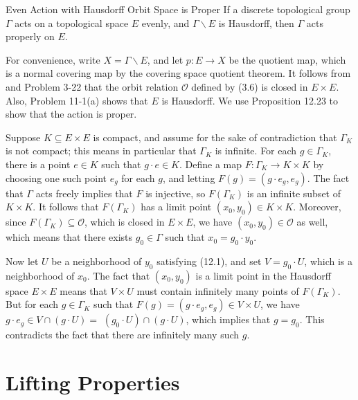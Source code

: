 \documentclass{report}
\begin{document}
\begin{proposition}{Even Action with Hausdorff Orbit Space is Proper}{}
	If a discrete topological group $\Gamma$ acts on a topological space $E$ evenly, and $\Gamma\backslash E$ is Hausdorff, then $\Gamma$ acts properly on $E$.
\end{proposition}
\begin{prf}
	For convenience, write $X=\Gamma\backslash E$, and let $p: E \rightarrow X$ be the quotient map, which is a normal covering map by the covering space quotient theorem. It follows
	from  and Problem 3-22 that the orbit relation $\mathcal{O}$ defined by (3.6) is closed in $E \times E$. Also, Problem 11-1(a) shows that $E$ is Hausdorff. We use Proposition 12.23 to show that the action is proper.

Suppose $K \subseteq E \times E$ is compact, and assume for the sake of contradiction that $\Gamma_K$ is not compact; this means in particular that $\Gamma_K$ is infinite. For each $g \in \Gamma_K$, there is a point $e \in K$ such that $g \cdot e \in K$. Define a map $F: \Gamma_K \rightarrow K \times K$ by choosing one such point $e_g$ for each $g$, and letting $F(g)=\left(g \cdot e_g, e_g\right)$. The fact that $\Gamma$ acts freely implies that $F$ is injective, so $F\left(\Gamma_K\right)$ is an infinite subset of $K \times K$. It follows that $F\left(\Gamma_K\right)$ has a limit point $\left(x_0, y_0\right) \in K \times K$. Moreover, since $F\left(\Gamma_K\right) \subseteq \mathcal{O}$, which is closed in $E \times E$, we have $\left(x_0, y_0\right) \in \mathcal{O}$ as well, which means that there exists $g_0 \in \Gamma$ such that $x_0=g_0 \cdot y_0$.

Now let $U$ be a neighborhood of $y_0$ satisfying (12.1), and set $V=g_0 \cdot U$, which is a neighborhood of $x_0$. The fact that $\left(x_0, y_0\right)$ is a limit point in the Hausdorff space $E \times E$ means that $V \times U$ must contain infinitely many points of $F\left(\Gamma_K\right)$. But for each $g \in \Gamma_K$ such that $F(g)=\left(g \cdot e_g, e_g\right) \in V \times U$, we have $g \cdot e_g \in V \cap(g \cdot U)=$ $\left(g_0 \cdot U\right) \cap(g \cdot U)$, which implies that $g=g_0$. This contradicts the fact that there are infinitely many such $g$.
\end{prf}
\section{Lifting Properties}
\end{document}
